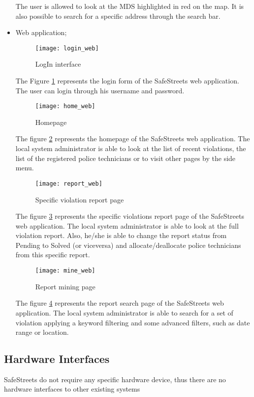 \begin{itemize}
            The user is allowed to look at the MDS highlighted in red on the map. It is also
            possible to search for a specific address through the search bar.
            \newpage
    \item  Web application;
    \begin{figure}[H]
        \centering
        \texttt{[image: login\_web]}
        \caption{LogIn interface}
        \label{fig:login_web}
    \end{figure}
    The Figure \ref{fig:login_web} represents the login form of the SafeStreets
    web application. The user can login through his username
    and password.
    \begin{figure}[H]
        \centering
        \texttt{[image: home\_web]}
        \caption{Homepage}
        \label{fig:home_web}
    \end{figure}
    The figure \ref{fig:home_web} represents the homepage of the SafeStreets
    web application. The local system administrator is able to look at the list
    of recent violations, the list of the registered police technicians or to visit
    other pages by the side menu.
    \begin{figure}[H]
        \centering
        \texttt{[image: report\_web]}
        \caption{Specific violation report page}
        \label{fig:report_web}
    \end{figure}
    The figure \ref{fig:report_web} represents the specific violations report
    page of the SafeStreets web application. 
    The local system administrator is able to look at the full violation report.
    Also, he/she is able to change the report status from Pending to Solved (or viceversa)
    and allocate/deallocate police technicians from this specific report.
    \begin{figure}[H]
        \centering
        \texttt{[image: mine\_web]}
        \caption{Report mining page}
        \label{fig:mine_web}
    \end{figure}
    The figure \ref{fig:mine_web} represents the report search page of the SafeStreets web application. 
    The local system administrator is able to search for a set of violation applying a keyword filtering
    and some advanced filters, such as date range or location.
\end{itemize}

\subsection{Hardware Interfaces}
SafeStreets do not require any specific hardware device, 
thus there are no hardware interfaces to other existing systems
